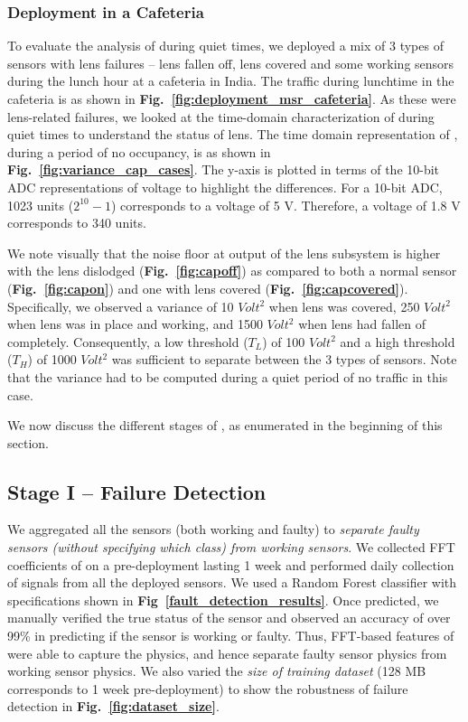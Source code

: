 \subsubsection{Deployment in a Cafeteria}\label{subsubsec:cafeteria} To evaluate the analysis of \aout during quiet times, we deployed a mix of 3 types of sensors with lens failures -- lens fallen off, lens covered and some working sensors during the lunch hour at a cafeteria in India. The traffic during lunchtime in the cafeteria is as shown in {\bfseries Fig.~\ref{fig:deployment_msr_cafeteria}}. As these were lens-related failures, we looked at the time-domain characterization of \aout during quiet times to understand the status of lens. The time domain representation of \aout, during a period of no occupancy, is as shown in {\bfseries Fig.~\ref{fig:variance_cap_cases}}. The y-axis is plotted in terms of the 10-bit ADC representations of voltage to highlight the differences. For a 10-bit ADC, 1023 units (\ie $2^{10} - 1$) corresponds to a voltage of 5 V. Therefore, a voltage of 1.8 V corresponds to 340 units.

We note visually that the noise floor at output of the lens subsystem is higher with the lens dislodged ({\bfseries Fig.~\ref{fig:capoff}}) as compared to both a normal sensor ({\bfseries Fig.~\ref{fig:capon}}) and one with lens covered ({\bfseries Fig.~\ref{fig:capcovered}}). Specifically, we observed a variance of 10 $Volt^2$ when lens was covered, 250 $Volt^2$ when lens was in place and working, and 1500 $Volt^2$ when lens had fallen of completely. Consequently, a low threshold ($T_L$) of 100 $Volt^2$ and a high threshold ($T_H$) of 1000 $Volt^2$ was sufficient to separate between the 3 types of sensors. Note that the variance had to be computed during a quiet period of no traffic in this case. %

We now discuss the different stages of \sol, as enumerated in the beginning of this section. 

\subsection{Stage I -- Failure Detection}
\label{subsec:fail_detection}

We aggregated all the sensors (both working and faulty) to \textit{separate faulty sensors (without specifying which class) from working sensors}. 
We collected FFT coefficients of \aout on a pre-deployment lasting 1 week and performed daily collection of \aout signals from all the deployed sensors. 
We used a Random Forest classifier with specifications shown in {\bfseries Fig~\ref{fault_detection_results}}. 
Once predicted, we manually verified the true status of the sensor and observed an accuracy of over 99\% in predicting if the sensor is working or faulty. 
Thus, FFT-based features of \aout were able to capture the physics, and hence separate faulty sensor physics from working sensor physics.
We also varied the \textit{size of training dataset} (128 MB corresponds to 1 week pre-deployment) to show the robustness of failure detection in {\bfseries Fig.~\ref{fig:dataset_size}}.


